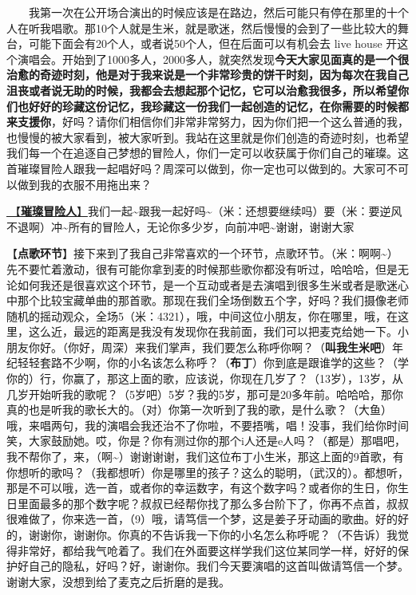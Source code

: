 \documentclass[]{ctexbook}
\begin{document}
  我第一次在公开场合演出的时候应该是在路边，然后可能只有停在那里的十个人在听我唱歌。那10个人就是生米，就是歌迷，然后慢慢的会到了一些比较大的舞台，可能下面会有20个人，或者说50个人，但在后面可以有机会去 live house 开这个演唱会。开始到了1000多人，2000多人，就突然发现\textbf{今天大家见面真的是一个很治愈的奇迹时刻，他是对于我来说是一个非常珍贵的饼干时刻，因为每次在我自己沮丧或者说无助的时候，我都会去想起那个记忆，它可以治愈我很多，所以希望你们也好好的珍藏这份记忆，我珍藏这一份我们一起创造的记忆，在你需要的时候都来支援你}，好吗？请你们相信你们非常非常努力，因为你们把一个这么普通的我，也慢慢的被大家看到，被大家听到。我站在这里就是你们创造的奇迹时刻，也希望我们每一个在追逐自己梦想的冒险人，你们一定可以收获属于你们自己的璀璨。这首璀璨冒险人跟我一起唱好吗？周深可以做到，你一定也可以做到的。大家可不可以做到我的衣服不用拖出来？

\hyperref[adventurers]{🎵【\textbf{璀璨冒险人}】}我们一起\textasciitilde 跟我一起好吗\textasciitilde（米：还想要继续吗）要（米：要逆风不退啊）冲\textasciitilde 所有的冒险人，无论你多少岁，向前冲吧\textasciitilde 谢谢，谢谢大家

【\textbf{点歌环节}】接下来到了我自己非常喜欢的一个环节，点歌环节。（米：啊啊\textasciitilde）先不要忙着激动，很有可能你拿到麦的时候那些歌你都没有听过，哈哈哈，但是无论如何我还是很喜欢这个环节，是一个互动或者是去演唱到很多生米或者是歌迷心中那个比较宝藏单曲的那首歌。那现在我们全场倒数五个字，好吗？我们摄像老师随机的摇动观众，全场5（米：4321），哦，中间这位小朋友，你在哪里，哦，在这里，这么近，最远的距离是我没有发现你在我前面，我们可以把麦克给她一下。小朋友你好。（你好，周深）来我们掌声，我们要怎么称呼你啊？（\textbf{叫我生米吧}）年纪轻轻套路不少啊，你的小名该怎么称呼？（\textbf{布丁}）你到底是跟谁学的这些？（学你的）行，你赢了，那这上面的歌，应该说，你现在几岁了？（13岁），13岁，从几岁开始听我的歌呢？（5岁吧）5岁？我的5岁，那可是20多年前。哈哈哈，那你真的也是听我的歌长大的。（对）你第一次听到了我的歌，是什么歌？（大鱼）哦，来唱两句，我的演唱会我还治不了你啦，不要捂嘴，唱！没事，我们给你时间笑，大家鼓励她。哎，你是？你有测过你的那个i人还是e人吗？（都是）那唱吧，我不帮你了，来，（啊\textasciitilde）谢谢谢谢，我们这位布丁小生米，那这上面的9首歌，有你想听的歌吗？（我都想听）你是哪里的孩子？这么的聪明，（武汉的）。都想听，那是不可以哦，选一首，或者你的幸运数字，有这个数字吗？或者你的生日，你生日里面最多的那个数字呢？叔叔已经帮你找了那么多台阶下了，你再不点首，叔叔很难做了，你来选一首，（9）哦，请笃信一个梦，这是姜子牙动画的歌曲。好的好的，谢谢你，谢谢你。你真的不告诉我一下你的小名怎么称呼呢？（不告诉）我觉得非常好，都给我气呛着了。我们在外面要这样学我们这位某同学一样，好好的保护好自己的隐私，好吗？好，谢谢你。我们今天要演唱的这首叫做请笃信一个梦。谢谢大家，没想到给了麦克之后折磨的是我。
\end{document}
